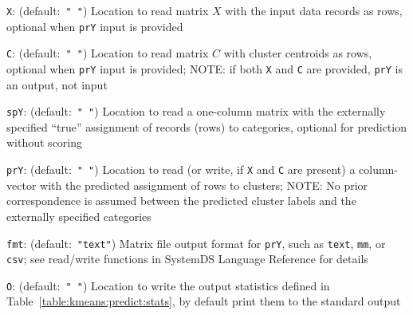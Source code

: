 \begin{Description}
\item[{\tt X}:] (default:\mbox{ }{\tt " "})
Location to read matrix $X$ with the input data records as rows,
optional when {\tt prY} input is provided
\item[{\tt C}:] (default:\mbox{ }{\tt " "})
Location to read matrix $C$ with cluster centroids as rows, optional
when {\tt prY} input is provided; NOTE: if both {\tt X} and {\tt C} are
provided, {\tt prY} is an output, not input
\item[{\tt spY}:] (default:\mbox{ }{\tt " "})
Location to read a one-column matrix with the externally specified ``true''
assignment of records (rows) to categories, optional for prediction without
scoring
\item[{\tt prY}:] (default:\mbox{ }{\tt " "})
Location to read (or write, if {\tt X} and {\tt C} are present) a
column-vector with the predicted assignment of rows to clusters;
NOTE: No prior correspondence is assumed between the predicted
cluster labels and the externally specified categories
\item[{\tt fmt}:] (default:\mbox{ }{\tt "text"})
Matrix file output format for {\tt prY}, such as {\tt text}, {\tt mm},
or {\tt csv}; see read/write functions in SystemDS Language Reference
for details
\item[{\tt O}:] (default:\mbox{ }{\tt " "})
Location to write the output statistics defined in 
Table~\ref{table:kmeans:predict:stats}, by default print them to the
standard output
\end{Description}


